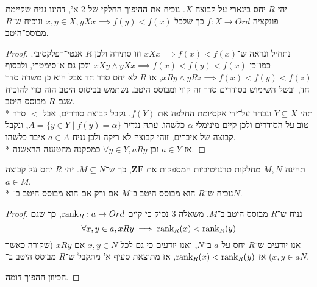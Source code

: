 \Question{}
\Subquestion{}
יהי $R$ יחס בינארי על קבוצה $X$.
נוכיח את ההיפוך החלקי של 2 א', דהינו נניח שקיימת פונקציה $f : X \to Ord$ כך שלכל $x, y \in X, y X x \implies f(y) < f(x)$ ונוכיח ש־$R$ מבוסס־היטב.
\begin{proof}
	נתחיל ונראה ש־$x X x \implies f(x) < f(x)$ וזו סתירה ולכן $R$ אנטי־רפלקסיבי. כמו־כן $x X y \land y X x \implies f(x) < f(y) < f(x)$ ולכן גם א־סימטרי, ולבסוף $x R y \land y R z \implies f(x) < f(y) < f(z)$,
	 אז $R$ לא יחס סדר חד אבל הוא כן משרה סדר חד, ובשל השימוש בסודרים סדר זה קווי ומבוסס היטב.
	 נשתמש בביסוס היטב הזה כדי להוכיח שגם $R$ מבוסס היטב. \\*
	 תהי $Y \subseteq X$ ונבחר על־ידי אקסיומת החלפה את $f(Y)$, נקבל קבוצת סודרים, אבל $<$ סדר טוב על הסודרים ולכן קיים מינימלי $\alpha$ כלשהו.
	 עתה נגדיר $A = \{ y \in Y \mid f(y) = \alpha \}$, ונקבל קבוצה של איברים, זוהי קבוצה לא ריקה ולכן נניח $a \in A$ איבר כלשהו. \\*
	 אז $a \in Y$ וכן $\forall y \in Y, a R y$ כמסקנה מהטענה הראשנה.
\end{proof}

\Subquestion{}
תהינה $M, N$ מחלקות טרנזיטיביות המספקות את $\textbf{ZF}$, כך ש־$M \subseteq N$.
יהי $R$ יחס על קבוצה $a \in M$. \\*
נוכיח ש־$R$ הוא מבוסס היטב ב־$M$ אם ורק אם הוא מבוסס היטב ב־$N$.
\begin{proof}
	נניח ש־$R$ מבוסס היטב ב־$M$.
	משאלה 3 נסיק כי קיים $\operatorname{rank}_R : a \to Ord$, כך שגם
	\[
		\forall x, y \in a, x R y \implies \operatorname{rank}_R(x) < \operatorname{rank}_R(y)
	\]
	אנו יודעים ש־$R$ יחס על $a$ ב־$N$, ואנו יודעים כי גם לכל $x, y \in N$ אם $x R y$ (שקורה כאשר $x, y \in a$) אז $\operatorname{rank}_R(x) < \operatorname{rank}_R(y)$, אז מתוצאת סעיף א' מתקבל ש־$R$ מבוסס היטב ב־$N$.

	הכיוון ההפוך דומה.
\end{proof}


